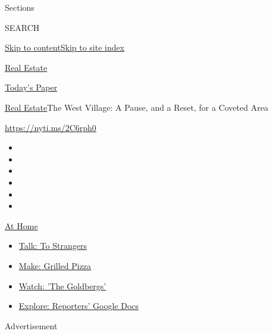 Sections

SEARCH

\protect\hyperlink{site-content}{Skip to
content}\protect\hyperlink{site-index}{Skip to site index}

\href{https://www.nytimes.com/section/realestate}{Real Estate}

\href{https://myaccount.nytimes.com/auth/login?response_type=cookie\&client_id=vi}{}

\href{https://www.nytimes.com/section/todayspaper}{Today's Paper}

\href{/section/realestate}{Real Estate}\textbar{}The West Village: A
Pause, and a Reset, for a Coveted Area

\url{https://nyti.ms/2C6rph0}

\begin{itemize}
\item
\item
\item
\item
\item
\item
\end{itemize}

\href{https://www.nytimes.com/spotlight/at-home?action=click\&pgtype=Article\&state=default\&region=TOP_BANNER\&context=at_home_menu}{At
Home}

\begin{itemize}
\tightlist
\item
  \href{https://www.nytimes.com/2020/08/03/well/family/the-benefits-of-talking-to-strangers.html?action=click\&pgtype=Article\&state=default\&region=TOP_BANNER\&context=at_home_menu}{Talk:
  To Strangers}
\item
  \href{https://www.nytimes.com/2020/08/01/at-home/coronavirus-make-pizza-on-a-grill.html?action=click\&pgtype=Article\&state=default\&region=TOP_BANNER\&context=at_home_menu}{Make:
  Grilled Pizza}
\item
  \href{https://www.nytimes.com/2020/07/31/arts/television/goldbergs-abc-stream.html?action=click\&pgtype=Article\&state=default\&region=TOP_BANNER\&context=at_home_menu}{Watch:
  'The Goldbergs'}
\item
  \href{https://www.nytimes.com/interactive/2020/at-home/even-more-reporters-editors-diaries-lists-recommendations.html?action=click\&pgtype=Article\&state=default\&region=TOP_BANNER\&context=at_home_menu}{Explore:
  Reporters' Google Docs}
\end{itemize}

Advertisement


